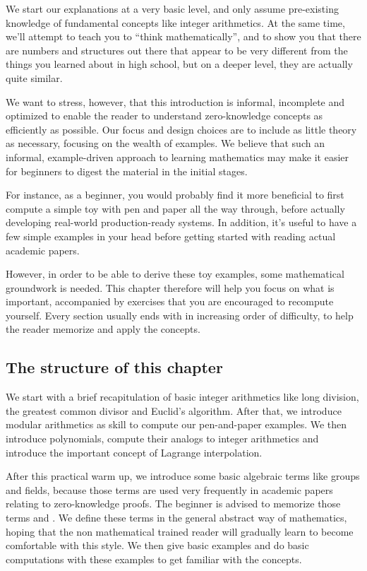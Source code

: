 We start our explanations at a very basic level, and only assume pre-existing knowledge of fundamental concepts like integer arithmetics. At the same time, we'll attempt to teach you to ``think mathematically'', and to show you that there are numbers and  structures out there that appear to be very different from the things you learned about in high school, but on a deeper level, they are actually quite similar.

We want to stress, however, that this introduction is informal, incomplete and optimized to enable the reader to understand zero-knowledge concepts as efficiently as possible. Our focus and design choices are to include as little theory as necessary, focusing on  the wealth of  examples. We believe that such an informal, example-driven approach to learning mathematics may make it easier for beginners to digest the material in the initial stages. 

For instance, as a beginner, you would probably find it more beneficial to first compute a simple toy  with pen and paper all the way through, before actually developing real-world production-ready systems. In addition, it's useful to have a few simple examples in your head before getting started with reading actual academic papers.

However, in order to be able to derive these toy examples, some mathematical groundwork is needed. This chapter therefore will help you focus on what is important, accompanied by exercises that you are encouraged to recompute yourself. Every section usually ends with  in increasing order of difficulty, to help the reader memorize and apply the concepts. 


\subsection{The structure of this chapter}

We start with a brief recapitulation of basic integer arithmetics like long division, the greatest common divisor and Euclid's algorithm. After that, we introduce modular arithmetics as  skill to compute our pen-and-paper examples. We then introduce polynomials, compute their analogs to integer arithmetics and introduce the important concept of Lagrange interpolation.

After this practical warm up, we introduce some basic algebraic terms like groups and fields, because those terms are used very frequently in academic papers relating to zero-knowledge proofs. The beginner is  advised to memorize those terms and . We define these terms in the general abstract way of mathematics, hoping that the non mathematical trained reader will gradually learn to become comfortable with this style. We then give basic examples and do basic computations with these examples to get familiar with the concepts. 

